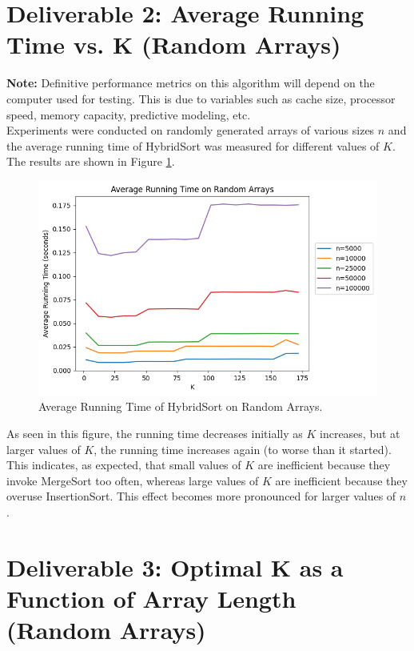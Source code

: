 \documentclass{article}
\begin{document}
\section*{Deliverable 2: Average Running Time vs. K (Random Arrays)}
\textbf{Note:} Definitive performance metrics on this algorithm will depend on the computer used for testing. This is due to variables such as cache size, processor speed, memory capacity, predictive modeling, etc. \\

Experiments were conducted on randomly generated arrays of various sizes \( n \) and the average running time of HybridSort was measured for different values of \( K \). The results are shown in Figure \ref{fig:random}.
	
\begin{figure}[h!]
    \centering
    \includegraphics[width=\textwidth]{random_results.png}
    \caption{Average Running Time of HybridSort on Random Arrays.}
    \label{fig:random}
\end{figure}

As seen in this figure, the running time decreases initially as \( K \) increases, but at larger values of \( K \), the running time increases again (to worse than it started). This indicates, as expected, that small values of \( K \) are inefficient because they invoke MergeSort too often, whereas large values of \( K \) are inefficient because they overuse InsertionSort. This effect becomes more pronounced for larger values of $n$.

\section*{Deliverable 3: Optimal K as a Function of Array Length (Random Arrays)}
	
\end{document}
